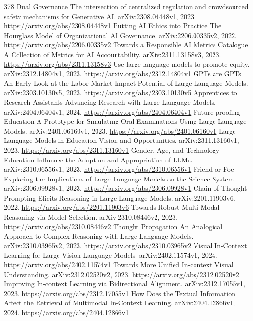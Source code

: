 \documentclass[11pt]{article}
\begin{document}
\begin{thebibliography}{378}
 Dual Governance The intersection of centralized regulation and crowdsourced safety mechanisms for Generative AI. arXiv:2308.04448v1, 2023. \url{https://arxiv.org/abs/2308.04448v1}
 Putting AI Ethics into Practice The Hourglass Model of Organizational AI Governance. arXiv:2206.00335v2, 2022. \url{https://arxiv.org/abs/2206.00335v2}
 Towards a Responsible AI Metrics Catalogue A Collection of Metrics for AI Accountability. arXiv:2311.13158v3, 2023. \url{https://arxiv.org/abs/2311.13158v3}
 Use large language models to promote equity. arXiv:2312.14804v1, 2023. \url{https://arxiv.org/abs/2312.14804v1}
 GPTs are GPTs An Early Look at the Labor Market Impact Potential of Large Language Models. arXiv:2303.10130v5, 2023. \url{https://arxiv.org/abs/2303.10130v5}
 Apprentices to Research Assistants Advancing Research with Large Language Models. arXiv:2404.06404v1, 2024. \url{https://arxiv.org/abs/2404.06404v1}
 Future-proofing Education A Prototype for Simulating Oral Examinations Using Large Language Models. arXiv:2401.06160v1, 2023. \url{https://arxiv.org/abs/2401.06160v1}
 Large Language Models in Education Vision and Opportunities. arXiv:2311.13160v1, 2023. \url{https://arxiv.org/abs/2311.13160v1}
 Gender, Age, and Technology Education Influence the Adoption and Appropriation of LLMs. arXiv:2310.06556v1, 2023. \url{https://arxiv.org/abs/2310.06556v1}
 Friend or Foe Exploring the Implications of Large Language Models on the Science System. arXiv:2306.09928v1, 2023. \url{https://arxiv.org/abs/2306.09928v1}
 Chain-of-Thought Prompting Elicits Reasoning in Large Language Models. arXiv:2201.11903v6, 2022. \url{https://arxiv.org/abs/2201.11903v6}
 Towards Robust Multi-Modal Reasoning via Model Selection. arXiv:2310.08446v2, 2023. \url{https://arxiv.org/abs/2310.08446v2}
 Thought Propagation An Analogical Approach to Complex Reasoning with Large Language Models. arXiv:2310.03965v2, 2023. \url{https://arxiv.org/abs/2310.03965v2}
 Visual In-Context Learning for Large Vision-Language Models. arXiv:2402.11574v1, 2024. \url{https://arxiv.org/abs/2402.11574v1}
 Towards More Unified In-context Visual Understanding. arXiv:2312.02520v2, 2023. \url{https://arxiv.org/abs/2312.02520v2}
 Improving In-context Learning via Bidirectional Alignment. arXiv:2312.17055v1, 2023. \url{https://arxiv.org/abs/2312.17055v1}
 How Does the Textual Information Affect the Retrieval of Multimodal In-Context Learning. arXiv:2404.12866v1, 2024. \url{https://arxiv.org/abs/2404.12866v1}

\end{thebibliography}
\end{document}
